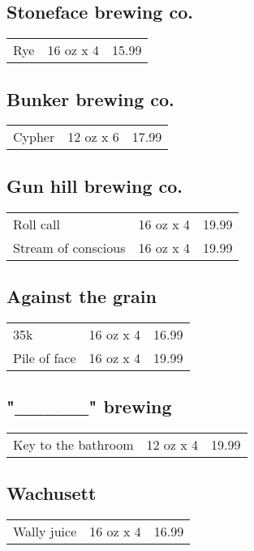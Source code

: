 \documentclass{article}%
\begin{document}
\begin{multicols}{3}
%
\subsection*{Stoneface brewing co.}%
\begin{tabular}{l c r}%
Rye&16 oz x 4&15.99\\%
\end{tabular}

%
\subsection*{Bunker brewing co.}%
\begin{tabular}{l c r}%
Cypher&12 oz x 6&17.99\\%
\end{tabular}

%
\subsection*{Gun hill brewing co.}%
\begin{tabular}{l c r}%
Roll call&16 oz x 4&19.99\\%
Stream of conscious&16 oz x 4&19.99\\%
\end{tabular}

%
\subsection*{Against the grain}%
\begin{tabular}{l c r}%
35k&16 oz x 4&16.99\\%
Pile of face&16 oz x 4&19.99\\%
\end{tabular}

%
\subsection*{"\_\_\_\_\_" brewing}%
\begin{tabular}{l c r}%
Key to the bathroom&12 oz x 4&19.99\\%
\end{tabular}

%
\subsection*{Wachusett}%
\begin{tabular}{l c r}%
Wally juice&16 oz x 4&16.99\\%
\end{tabular}


\end{multicols}
\end{document}

